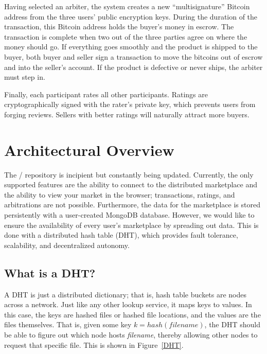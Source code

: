 \documentclass[11pt,twocolumn]{article}
\begin{document}
Having selected an arbiter, the system creates a new ``multisignature'' Bitcoin address from the three users' public encryption keys.
During the duration of the transaction, this Bitcoin address holds the buyer's money in escrow.
The transaction is complete when two out of the three parties agree on where the money should go.
If everything goes smoothly and the product is shipped to the buyer, both buyer and seller sign a transaction to move the bitcoins out of escrow and into the seller's account.
If the product is defective or never ships, the arbiter must step in.

Finally, each participant rates all other participants.
Ratings are cryptographically signed with the rater's private key, which prevents users from forging reviews.
Sellers with better ratings will naturally attract more buyers. 






\section{Architectural Overview}
\label{sec:low_level}
The \OpenBazaar/ repository is incipient but constantly being updated.
Currently, the only supported features are the ability to connect to the distributed marketplace and the ability to view your market in the browser; transactions, ratings, and arbitrations are not possible.
Furthermore, the data for the marketplace is stored persistently with a user-created MongoDB database.
However, we would like to ensure the availability of every user's marketplace by spreading out data.
This is done with a distributed hash table (DHT), which provides fault tolerance, scalability, and decentralized autonomy.

\subsection{What is a DHT?}
A DHT is just a distributed dictionary; that is, hash table buckets are nodes across a network.
Just like any other lookup service, it maps keys to values.
In this case, the keys are hashed files or hashed file locations, and the values are the files themselves.
That is, given some key $k = hash(filename)$, the DHT should be able to figure out which node hosts \emph{filename}, thereby allowing other nodes to request that specific file.
This is shown in Figure~\ref{DHT}.
\end{document}

